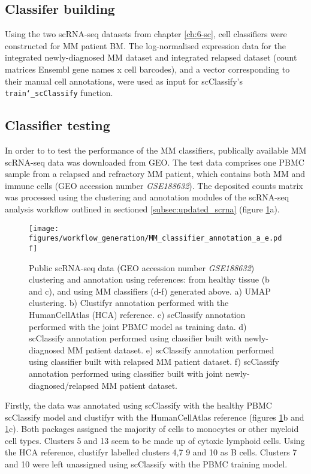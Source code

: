 \subsection{Classifer building}\label{subsec:MM_classifier_model_building}
Using the two scRNA-seq datasets from chapter \ref{ch:6-sc}, cell classifiers were constructed for MM patient BM\@.
The log-normalised expression data for the integrated newly-diagnosed MM dataset and integrated relapsed dataset (count matrices Ensembl gene names x cell barcodes), and a vector corresponding to their manual cell annotations, were used as input for scClassify's \texttt{train\char`_scClassify} function.


\subsection{Classifier testing}
In order to to test the performance of the MM classifiers, publically available MM scRNA-seq data was downloaded from GEO\@.
The test data comprises one PBMC sample from a relapsed and refractory MM patient, which contains both MM and immune cells (GEO accession number \textit{GSE188632}).
The deposited counts matrix was processed using the clustering and annotation modules of the scRNA-seq analysis workflow outlined in sectioned \ref{subsec:updated_scrna} (figure \ref{fig:mm_class_umap_annotate}a).
\begin{figure}[htb]
\centering
\texttt{[image: figures/workflow\_generation/MM\_classifier\_annotation\_a\_e.pdf]}
\caption[Public scRNA-seq data clustering and annotation]{Public scRNA-seq data (GEO accession number \textit{GSE188632}) clustering and annotation using references: from healthy tissue (b and c), and using MM classifiers (d-f) generated above.
a) UMAP clustering.
b) Clustifyr annotation performed with the HumanCellAtlas (HCA) reference.
c) scClassify annotation performed with the joint PBMC model as training data.
d) scClassify annotation performed using classifier built with newly-diagnosed MM patient dataset.
e) scClassify annotation performed using classifier built with relapsed MM patient dataset.
f) scClassify annotation performed using classifier built with joint newly-diagnosed/relapsed MM patient dataset.
}
\label{fig:mm_class_umap_annotate}
\end{figure}
%
Firstly, the data was annotated using scClassify with the healthy PBMC scClassify model and clustifyr with the HumanCellAtlas reference (figures \ref{fig:mm_class_umap_annotate}b and \ref{fig:mm_class_umap_annotate}c).
Both packages assigned the majority of cells to monocytes or other myeloid cell types.
Clusters 5 and 13 seem to be made up of cytoxic lymphoid cells.
Using the HCA reference, clustifyr labelled clusters 4,7 9 and 10 as B cells.
Clusters 7 and 10 were left unassigned using scClassify with the PBMC training model.

